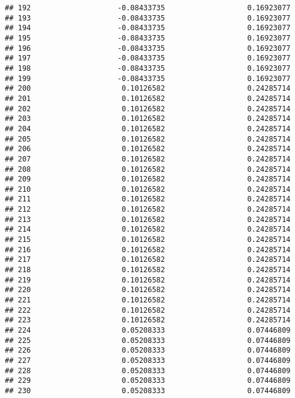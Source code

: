 \documentclass[]{article}
\begin{document}
\begin{verbatim}
## 192                    -0.08433735                   0.16923077
## 193                    -0.08433735                   0.16923077
## 194                    -0.08433735                   0.16923077
## 195                    -0.08433735                   0.16923077
## 196                    -0.08433735                   0.16923077
## 197                    -0.08433735                   0.16923077
## 198                    -0.08433735                   0.16923077
## 199                    -0.08433735                   0.16923077
## 200                     0.10126582                   0.24285714
## 201                     0.10126582                   0.24285714
## 202                     0.10126582                   0.24285714
## 203                     0.10126582                   0.24285714
## 204                     0.10126582                   0.24285714
## 205                     0.10126582                   0.24285714
## 206                     0.10126582                   0.24285714
## 207                     0.10126582                   0.24285714
## 208                     0.10126582                   0.24285714
## 209                     0.10126582                   0.24285714
## 210                     0.10126582                   0.24285714
## 211                     0.10126582                   0.24285714
## 212                     0.10126582                   0.24285714
## 213                     0.10126582                   0.24285714
## 214                     0.10126582                   0.24285714
## 215                     0.10126582                   0.24285714
## 216                     0.10126582                   0.24285714
## 217                     0.10126582                   0.24285714
## 218                     0.10126582                   0.24285714
## 219                     0.10126582                   0.24285714
## 220                     0.10126582                   0.24285714
## 221                     0.10126582                   0.24285714
## 222                     0.10126582                   0.24285714
## 223                     0.10126582                   0.24285714
## 224                     0.05208333                   0.07446809
## 225                     0.05208333                   0.07446809
## 226                     0.05208333                   0.07446809
## 227                     0.05208333                   0.07446809
## 228                     0.05208333                   0.07446809
## 229                     0.05208333                   0.07446809
## 230                     0.05208333                   0.07446809

\end{verbatim}
\end{document}

